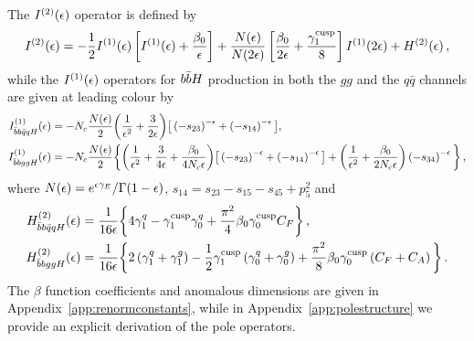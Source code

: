 \documentclass[main.tex]{subfiles}
\begin{document}
The $I^{(2)}(\epsilon)$ operator is defined by
\begin{equation}
I^{(2)}(\epsilon) =   - \frac{1}{2}I^{(1)}(\epsilon) \left[ I^{(1)}(\epsilon)
              + \frac{\beta_0}{\epsilon} \right]
              + \frac{N(\epsilon)}{N(2\epsilon)} \left[ \frac{\beta_0}{2\epsilon}
                        + \frac{\gamma_{1}^{{\mathrm{cusp}}}}{8} \right] I^{(1)}(2\epsilon)
              + H^{(2)}(\epsilon) \,,
\end{equation}
while the $I^{(1)}(\epsilon)$ operators for $b\bar{b}H$ production in both the $gg$ and the $q\bar{q}$ channels are given at leading colour by
\begin{align}
I_{\bar{b}b\bar{q}qH}^{(1)}(\epsilon) &= -N_c \frac{N(\epsilon)}{2} \bigg( \frac{1}{\epsilon^2} + \frac{3}{2\epsilon} \bigg) \big[ \left(-s_{23}\right)^{-\epsilon} + \left(-s_{14}\right)^{-\epsilon} \big], 
\label{eq:I1bbqqh}\\
I_{\bar{b}bggH}^{(1)}(\epsilon) &= -N_c \frac{N(\epsilon)}{2} \bigg\lbrace \bigg( \frac{1}{\epsilon^2} + \frac{3}{4\epsilon} + \frac{\beta_0}{4 N_c\epsilon} \bigg) \big[ \left(-s_{23}\right)^{-\epsilon} + \left(-s_{14}\right)^{-\epsilon} \big]
                 + \bigg( \frac{1}{\epsilon^2} + \frac{\beta_0}{2 N_c \epsilon} \bigg) \left(-s_{34}\right)^{-\epsilon} \bigg\rbrace \,,
\label{eq:I1bbggh}
\end{align}
where $N(\epsilon) = {e^{\epsilon \gamma_E}}/{\Gamma(1-\epsilon)}$, $s_{14} = s_{23}-s_{15}-s_{45}+p_5^2$ and
\begin{align}
H_{\bar{b}b\bar{q}qH}^{(2)}(\epsilon) &= \frac{1}{16\epsilon} \bigg\lbrace 4 \gamma_1^q - \gamma_1^{\mathrm{cusp}} \gamma_0^q + \frac{\pi^2}{4} \beta_0 \gamma_0^{\mathrm{cusp}} C_F \bigg\rbrace \,, \label{eq:H2bbqqH} \\
H_{\bar{b}bggH}^{(2)}(\epsilon) &=  \frac{1}{16\epsilon} \bigg\lbrace 2\left(\gamma_1^q+\gamma_1^g\right)
                                                - \frac{1}{2}\gamma_1^{\mathrm{cusp}} \left(\gamma_0^q+\gamma_0^g\right)
                                                + \frac{\pi^2}{8} \beta_0 \gamma_0^{\mathrm{cusp}} \left(C_F+C_A\right) \bigg\rbrace \,. \label{eq:H2bbggH}
\end{align}
The $\beta$ function coefficients and anomalous dimensions are given in Appendix~\ref{app:renormconstants}, while in Appendix~\ref{app:polestructure} we provide an explicit derivation of the pole operators.
\end{document}

